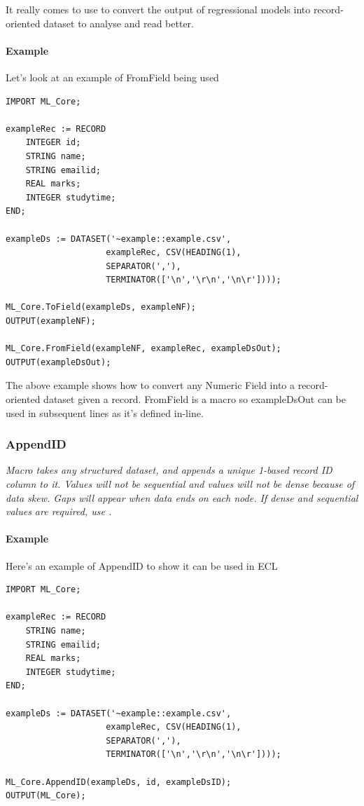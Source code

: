 \documentclass[a4paper,oneside,12pt]{book}
\begin{document}
It really comes to use to convert the output of regressional models into record-oriented dataset to analyse and read better. 

\paragraph{Example}

Let's look at an example of FromField being used

\begin{lstlisting}
IMPORT ML_Core;

exampleRec := RECORD
    INTEGER id;
    STRING name;
    STRING emailid;
    REAL marks;
    INTEGER studytime;
END;

exampleDs := DATASET('~example::example.csv', 
                    exampleRec, CSV(HEADING(1),
                    SEPARATOR(','),
                    TERMINATOR(['\n','\r\n','\n\r'])));

ML_Core.ToField(exampleDs, exampleNF);
OUTPUT(exampleNF);

ML_Core.FromField(exampleNF, exampleRec, exampleDsOut);
OUTPUT(exampleDsOut);
\end{lstlisting}

The above example shows how to convert any Numeric Field into a record-oriented dataset given a record. FromField is a macro so exampleDsOut can be used in subsequent lines as it's defined in-line.

\subsubsection{AppendID}\label{mlcore:appendid}

\textit{Macro takes any structured dataset, and appends a unique 1-based record ID column to it. Values will not be sequential and values will not be dense because of data skew. Gaps will appear when data ends on each node. If dense and sequential values are required, use .}

\paragraph{Example}

Here's an example of AppendID to show it can be used in ECL

\begin{lstlisting}
IMPORT ML_Core;

exampleRec := RECORD
    STRING name;
    STRING emailid;
    REAL marks;
    INTEGER studytime;
END;

exampleDs := DATASET('~example::example.csv', 
                    exampleRec, CSV(HEADING(1),
                    SEPARATOR(','),
                    TERMINATOR(['\n','\r\n','\n\r'])));

ML_Core.AppendID(exampleDs, id, exampleDsID);
OUTPUT(ML_Core);
\end{lstlisting}
\end{document}
